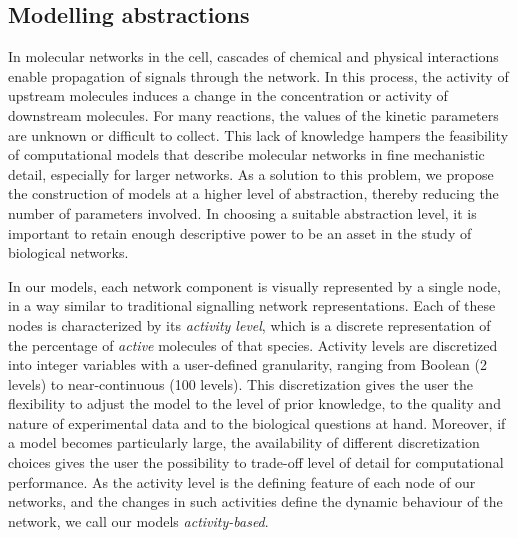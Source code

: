 \subsection{Modelling abstractions}\label{subsec:abstractions}

In molecular networks in the cell, cascades of chemical and physical interactions enable propagation of 
signals through the network. In this process, the activity of upstream molecules induces a change in the 
concentration or activity of downstream molecules. For many reactions, the values of the kinetic parameters 
are unknown or difficult to collect. This lack of knowledge hampers the feasibility 
of computational models that describe molecular networks in fine mechanistic detail, especially for larger networks.
As a solution to this problem, we propose the construction of models at a higher level of abstraction, 
thereby reducing the number of parameters involved. In choosing a suitable abstraction level, it is important to 
retain enough descriptive power to be an asset in the study of biological networks.


In our models, each network component is visually represented by a single node, in a way similar to traditional
signalling network representations.
Each of these nodes is characterized by its \emph{activity level}, which
is a discrete representation of the percentage of \emph{active} molecules of that species. Activity levels are discretized
into integer variables with a user-defined granularity, ranging from Boolean (2 levels) to near-continuous (100 levels).
This discretization gives the user the flexibility to adjust the model to the level of prior knowledge,
to the quality and nature of experimental data and to the biological questions at hand. Moreover, if a model
becomes particularly large, the availability of different discretization choices gives the user
the possibility to trade-off level of detail for computational performance. As the activity level is the
defining feature of each node of our networks, and the changes in such activities define the
dynamic behaviour of the network, we call our models \emph{activity-based}.

